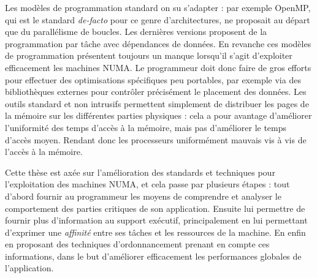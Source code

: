 Les modèles de programmation standard on su s'adapter : par exemple OpenMP, qui est le standard \emph{de-facto} pour ce genre d'architectures, ne proposait au départ que du parallélisme de boucles. Les dernières versions proposent de la programmation par tâche avec dépendances de données.
En revanche ces modèles de programmation présentent toujours un manque lorsqu'il s'agit d'exploiter efficacement les machines NUMA.
Le programmeur doit donc faire de gros efforts pour effectuer des optimisations spécifiques peu portables, par exemple via des bibliothèques externes pour contrôler précisément le placement des données.
Les outils standard et non intrusifs permettent simplement de distribuer les pages de la mémoire sur les différentes parties physiques : cela a pour avantage d'améliorer l'uniformité des temps d'accès à la mémoire, mais pas d'améliorer le temps d'accès moyen.
Rendant donc les processeurs uniformément mauvais vis à vis de l'accès à la mémoire.

Cette thèse est axée sur l'amélioration des standards et techniques pour l'exploitation des machines NUMA, et cela passe par plusieurs étapes : tout d'abord fournir au programmeur les moyens de comprendre et analyser le comportement des parties critiques de son application.
Ensuite lui permettre de fournir plus d'information au support exécutif, principalement en lui permettant d'exprimer une \emph{affinité} entre ses tâches et les ressources de la machine.
En enfin en proposant des techniques d'ordonnancement prenant en compte ces informations, dans le but d'améliorer efficacement les performances globales de l'application.







